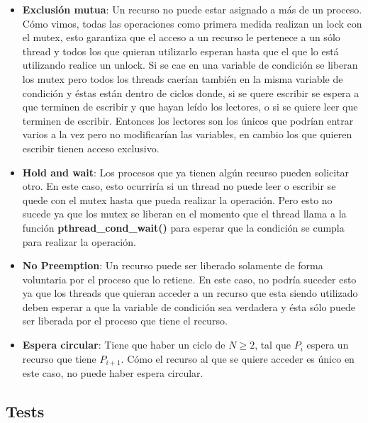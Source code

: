 \begin{itemize}
	\item \textbf{Exclusión mutua}: Un recurso no puede estar asignado a más de un proceso. 
\newline
	Cómo vimos, todas las operaciones como primera medida realizan un lock con el mutex, esto garantiza que el acceso a un recurso le pertenece a un sólo thread y todos los que quieran utilizarlo esperan hasta que el que lo está utilizando realice un unlock. Si se cae en una variable de condición se liberan los mutex pero todos los threads caerían también en la misma variable de condición y éstas están dentro de ciclos donde, si se quere escribir se espera a que terminen de escribir y que hayan leído los lectores, o si se quiere leer que terminen de escribir. Entonces los lectores son los únicos que podrían entrar varios a la vez pero no modificarían las variables, en cambio los que quieren escribir tienen acceso exclusivo.

	\item \textbf{Hold and wait}: Los procesos que ya tienen algún recurso pueden solicitar otro.
\newline
	En este caso, esto ocurriría si un thread no puede leer o escribir se quede con el mutex hasta que pueda realizar la operación. Pero esto no sucede ya que los mutex se liberan en el momento que el thread llama a la función \textbf{pthread\_cond\_wait()} para esperar que la condición se cumpla para realizar la operación.
	
	\item \textbf{No Preemption}: Un recurso puede ser liberado solamente de forma voluntaria por el proceso que lo retiene.
\newline
	En este caso, no podría suceder esto ya que los threads que quieran acceder a un recurso que esta siendo utilizado deben esperar a que la variable de condición sea verdadera y ésta sólo puede ser liberada por el proceso que tiene el recurso.
	
	\item \textbf{Espera circular}: Tiene que haber un ciclo de $N \geq 2$, tal que $P_i$ espera un recurso que tiene $P_{i+1}$.
\newline
	Cómo el recurso al que se quiere acceder es único en este caso, no puede haber espera circular.
\end{itemize}


\subsection{Tests}

